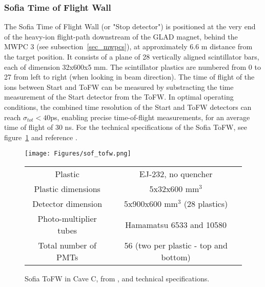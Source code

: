 
\subsubsection{Sofia Time of Flight Wall}
The Sofia Time of Flight Wall (or "Stop detector") is positioned at the very end of the heavy-ion flight-path downstream of the GLAD magnet, behind the MWPC 3 (see subsection~\ref{sec_mwpcs}), at approximately 6.6 m distance from the target position. It consists of a plane of 28 vertically aligned scintillator bars, each of dimension 32x600x5 mm. The scintillator plastics are numbered from 0 to 27 from left to right (when looking in beam direction). The time of flight of the ions between Start and ToFW can be measured by substracting the time measurement of  the Start detector from the ToFW. In optimal operating conditions, the combined time resolution of the Start and ToFW detectors can reach $\sigma_{tot} < 40$ps, enabling precise time-of-flight measurements, for an average time of flight of 30 ns\cite{martin2021fission}. For the technical specifications of the Sofia ToFW, see figure~\ref{fig:sof_tofw_pic} and reference \cite{bail2011time}.

\begin{figure}[htbp]
    \centering
    \texttt{[image: Figures/sof\_tofw.png]}

    \vspace{1em} %

	\begin{tabular}{cc}\hline 
  	Plastic & EJ-232, no quencher \\ 
  	Plastic dimensions & 5x32x600 mm$^3$ \\
  	Detector dimension & 5x900x600 mm$^3$ (28 plastics) \\ 
  	Photo-multiplier tubes &  Hamamatsu 6533 and 10580 \\
  	Total number of PMTs & 56 (two per plastic - top and bottom) \\ \hline 
  	\end{tabular}

    \caption{Sofia ToFW in Cave C, from \cite{martin2021fission}, and technical specifications.}
    \label{fig:sof_tofw_pic}
\end{figure}


